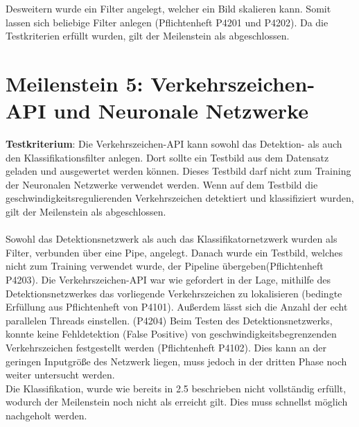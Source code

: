 \documentclass[12pt,a4paper,ngerman,enabledeprecatedfontcommands]{scrreprt}
\begin{document}
Desweitern wurde ein Filter angelegt, welcher ein Bild skalieren kann.
Somit lassen sich beliebige Filter anlegen (Pflichtenheft P4201 und P4202).
Da die Testkriterien erfüllt wurden, gilt der Meilenstein als abgeschlossen.\\

\section{Meilenstein 5: Verkehrszeichen-API und Neuronale Netzwerke}
\textbf{Testkriterium}: Die \gls{Verkehrszeichen-API} kann sowohl das Detektion- als auch den Klassifikationsfilter anlegen. Dort sollte ein Testbild aus dem Datensatz geladen und ausgewertet werden können. Dieses Testbild darf nicht zum Training der Neuronalen Netzwerke verwendet werden. Wenn auf dem Testbild die geschwindigkeitsregulierenden Verkehrszeichen detektiert und klassifiziert wurden, gilt der Meilenstein als abgeschlossen.\\
\\
Sowohl das Detektionsnetzwerk als auch das Klassifikatornetzwerk wurden als Filter, verbunden über eine Pipe, angelegt. Danach wurde ein Testbild, welches nicht zum Training verwendet wurde, der Pipeline übergeben(Pflichtenheft P4203). Die \gls{Verkehrszeichen-API} war wie gefordert in der Lage, mithilfe des Detektionsnetzwerkes das vorliegende Verkehrszeichen zu lokalisieren (bedingte Erfüllung aus Pflichtenheft von P4101). Außerdem lässt sich die Anzahl der echt parallelen Threads einstellen. (P4204)
Beim Testen des Detektionsnetzwerks, konnte keine Fehldetektion (False Positive) von geschwindigkeitsbegrenzenden Verkehrszeichen festgestellt werden (Pflichtenheft P4102). Dies kann an der geringen Inputgröße des Netzwerk liegen, muss jedoch in der dritten Phase noch weiter untersucht werden.\\
Die Klassifikation, wurde wie bereits in 2.5 beschrieben nicht vollständig erfüllt, wodurch der Meilenstein noch nicht als erreicht gilt.
Dies muss schnellst möglich nachgeholt werden.\\
\end{document}
